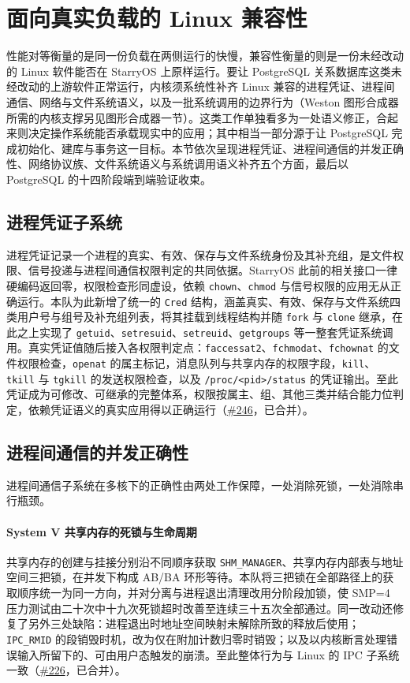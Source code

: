 \section{面向真实负载的 Linux 兼容性}

性能对等衡量的是同一份负载在两侧运行的快慢，兼容性衡量的则是一份未经改动的 Linux 软件能否在 StarryOS 上原样运行。要让 PostgreSQL 关系数据库这类未经改动的上游软件正常运行，内核须系统性补齐 Linux 兼容的进程凭证、进程间通信、网络与文件系统语义，以及一批系统调用的边界行为（Weston 图形合成器所需的内核支撑另见图形合成器一节）。这类工作单独看多为一处语义修正，合起来则决定操作系统能否承载现实中的应用；其中相当一部分源于让 PostgreSQL 完成初始化、建库与事务这一目标。本节依次呈现进程凭证、进程间通信的并发正确性、网络协议族、文件系统语义与系统调用语义补齐五个方面，最后以 PostgreSQL 的十四阶段端到端验证收束。

\subsection{进程凭证子系统}

进程凭证记录一个进程的真实、有效、保存与文件系统身份及其补充组，是文件权限、信号投递与进程间通信权限判定的共同依据。StarryOS 此前的相关接口一律硬编码返回零，权限检查形同虚设，依赖 \texttt{chown}、\texttt{chmod} 与信号权限的应用无从正确运行。本队为此新增了统一的 \texttt{Cred} 结构，涵盖真实、有效、保存与文件系统四类用户号与组号及补充组列表，将其挂载到线程结构并随 \texttt{fork} 与 \texttt{clone} 继承，在此之上实现了 \texttt{getuid}、\texttt{setresuid}、\texttt{setreuid}、\texttt{getgroups} 等一整套凭证系统调用。真实凭证值随后接入各权限判定点：\texttt{faccessat2}、\texttt{fchmodat}、\texttt{fchownat} 的文件权限检查，\texttt{openat} 的属主标记，消息队列与共享内存的权限字段，\texttt{kill}、\texttt{tkill} 与 \texttt{tgkill} 的发送权限检查，以及 \texttt{/proc/<pid>/status} 的凭证输出。至此凭证成为可修改、可继承的完整体系，权限按属主、组、其他三类并结合能力位判定，依赖凭证语义的真实应用得以正确运行（\href{https://github.com/rcore-os/tgoskits/pull/246}{\#246}，已合并）。

\subsection{进程间通信的并发正确性}

进程间通信子系统在多核下的正确性由两处工作保障，一处消除死锁，一处消除串行瓶颈。

\paragraph{System V 共享内存的死锁与生命周期}
共享内存的创建与挂接分别沿不同顺序获取 \texttt{SHM\_MANAGER}、共享内存内部表与地址空间三把锁，在并发下构成 AB/BA 环形等待。本队将三把锁在全部路径上的获取顺序统一为同一方向，并对分离与进程退出清理改用分阶段加锁，使 SMP=4 压力测试由二十次中十九次死锁超时改善至连续三十五次全部通过。同一改动还修复了另外三处缺陷：进程退出时地址空间映射未解除所致的释放后使用；\texttt{IPC\_RMID} 的段销毁时机，改为仅在附加计数归零时销毁；以及以内核断言处理错误输入所留下的、可由用户态触发的崩溃。至此整体行为与 Linux 的 IPC 子系统一致（\href{https://github.com/rcore-os/tgoskits/pull/226}{\#226}，已合并）。

